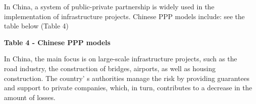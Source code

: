 In China, a system of public-private partnership is widely used in the
implementation of infrastructure projects. Chinese PPP models include:
see the table below (Table 4)

{\bfseries Table 4 - Chinese PPP models}


In China, the main focus is on large-scale infrastructure projects, such
as the road industry, the construction of bridges, airports, as well as
housing construction. The country' s authorities manage
the risk by providing guarantees and support to private companies,
which, in turn, contributes to a decrease in the amount of losses.

